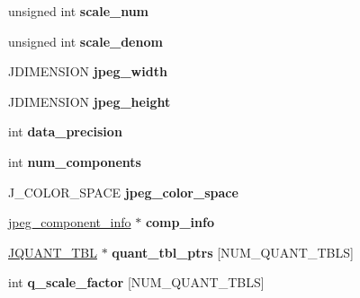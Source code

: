 \begin{DoxyCompactItemize}
unsigned int {\bfseries scale\+\_\+num}
\item 
\mbox{\label{structjpeg__compress__struct_a5cddd5b83366e7068f6f5ebfb30b511d}} 
unsigned int {\bfseries scale\+\_\+denom}
\item 
\mbox{\label{structjpeg__compress__struct_a710381e0a87f0a506f4f1144aa5a65c6}} 
J\+D\+I\+M\+E\+N\+S\+I\+ON {\bfseries jpeg\+\_\+width}
\item 
\mbox{\label{structjpeg__compress__struct_ad7c56898b497ca8c2a002010a5d7f38d}} 
J\+D\+I\+M\+E\+N\+S\+I\+ON {\bfseries jpeg\+\_\+height}
\item 
\mbox{\label{structjpeg__compress__struct_a134188f90a3332d64fc2bcf8af89a12b}} 
int {\bfseries data\+\_\+precision}
\item 
\mbox{\label{structjpeg__compress__struct_ae111615d0ff14a34b42c364f436aed9f}} 
int {\bfseries num\+\_\+components}
\item 
\mbox{\label{structjpeg__compress__struct_ad1db731be93151e7b43d453557857ce9}} 
J\+\_\+\+C\+O\+L\+O\+R\+\_\+\+S\+P\+A\+CE {\bfseries jpeg\+\_\+color\+\_\+space}
\item 
\mbox{\label{structjpeg__compress__struct_a2cdbc9dbfcf1e9a6e794822c20c067cb}} 
\hyperlink{structjpeg__component__info}{jpeg\+\_\+component\+\_\+info} $\ast$ {\bfseries comp\+\_\+info}
\item 
\mbox{\label{structjpeg__compress__struct_a99349f969e6ef0199d73b77005f1c7ac}} 
\hyperlink{struct_j_q_u_a_n_t___t_b_l}{J\+Q\+U\+A\+N\+T\+\_\+\+T\+BL} $\ast$ {\bfseries quant\+\_\+tbl\+\_\+ptrs} \mbox{[}N\+U\+M\+\_\+\+Q\+U\+A\+N\+T\+\_\+\+T\+B\+LS\mbox{]}
\item 
\mbox{\label{structjpeg__compress__struct_a8237825fde9b12ed7334574d0bd18f74}} 
int {\bfseries q\+\_\+scale\+\_\+factor} \mbox{[}N\+U\+M\+\_\+\+Q\+U\+A\+N\+T\+\_\+\+T\+B\+LS\mbox{]}
\item 
\mbox{\label{structjpeg__compress__struct_ad70d88daaa252af39cddd28d91d5e72b}} 

\end{DoxyCompactItemize}
